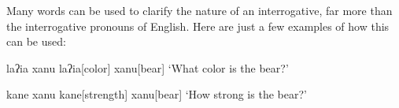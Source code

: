 Many words can be used to clarify the nature of an interrogative, far more than the interrogative pronouns of English. Here are just a few examples of how this can be used:

\begin{paracol}{2}
\ex
\begingl
\glpreamble laʔia xanu
\endpreamble
laʔia[color]
xanu[bear]
\glft `What color is the bear?'
\endgl
\xe
\switchcolumn

\ex
\begingl
\glpreamble kane xanu
\endpreamble
kane[strength]
xanu[bear]
\glft `How strong is the bear?'
\endgl
\xe
\end{paracol}